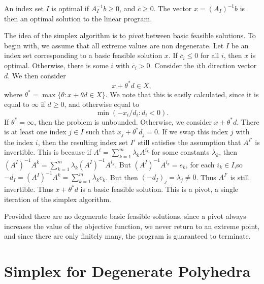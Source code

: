 An index set $I$ is optimal if $A_I^{-1}b \geq 0$, and $\overline{c} \geq 0$. The vector $x = (A_I)^{-1}b$ is then an optimal solution to the linear program.

The idea of the simplex algorithm is to \emph{pivot} between basic feasible solutions. To begin with, we assume that all extreme values are non degenerate. Let $I$ be an index set corresponding to a basic feasible solution $x$. If $\overline{c}_i \leq 0$ for all $i$, then $x$ is optimal. Otherwise, there is some $i$ with $\overline{c}_i > 0$. Consider the $i$th direction vector $d$. We then consider
%
\[ x + \theta^* d \in X, \]
%
where $\theta^* = \max \{ \theta : x + \theta d \in X \}$. We note that this is easily calculated, since it is equal to $\infty$ if $d \geq 0$, and otherwise equal to
%
\[ \min(-x_i/d_i : d_i < 0). \]
%
If $\theta^* = \infty$, then the problem is unbounded. Otherwise, we consider $x + \theta^* d$. There is at least one index $j \in I$ such that $x_j + \theta^* d_j = 0$. If we swap this index $j$ with the index $i$, then the resulting index set $I'$ still satisfies the assumption that $A^{I'}$ is invertible. This is because if $A^i = \sum_{k = 1}^m \lambda_k A^{i_k}$ for some constants $\lambda_k$, then $(A^I)^{-1} A^k = \sum_{k = 1}^m \lambda_k (A^I)^{-1} A^{i_k}$. But $(A^I)^{-1} A^{i_k} = e_k$, for each $i_k \in I$,so $-d_I = (A^I)^{-1} A^k = \sum_{k = 1}^m \lambda_k e_k$. But then $(-d_I)_j = \lambda_j \neq 0$. Thus $A^{I'}$ is still invertible. Thus $x + \theta^* d$ is a basic feasible solution. This is a pivot, a single iteration of the simplex algorithm.

Provided there are no degenerate basic feasible solutions, since a pivot always increases the value of the objective function, we never return to an extreme point, and since there are only finitely many, the program is guaranteed to terminate.

\section{Simplex for Degenerate Polyhedra}

